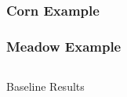 \documentclass[%
  aspectratio=169,
  9pt,
  USenglish,
  titlegraphic, %
  affiliationintitlepagehead,
  affiliation,
]{beamer}
\begin{document}
\begin{frame}
\begin{columns}
	\end{columns}
	
\end{frame}



\begin{frame}
	\frametitle{Corn Example}
	\examplecorn
\end{frame}

\begin{frame}
\frametitle{Meadow Example}
\examplemeadows
\end{frame}
%
%
%
%
%


{
	\begin{frame}[plain]
	
	\vfill
	\Huge\color{white}
	\begin{center}
		\begin{columns}
			\vspace{7em}
			
			\hfill 
			Baseline Results
			
		\end{columns}
	\end{center}
	
	\vfill
\end{frame}
}


\end{document}
